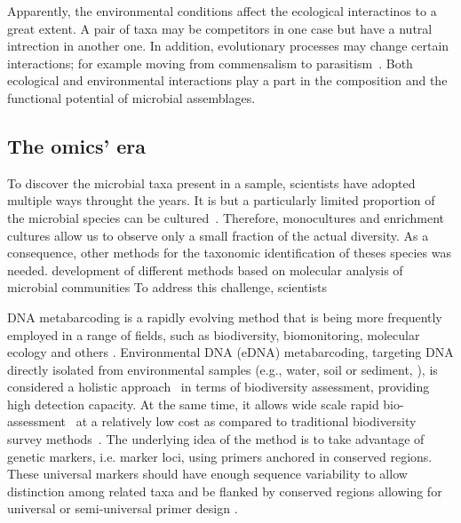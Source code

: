       Apparently, the environmental conditions affect the ecological interactinos to a
      great extent. 
      A pair of taxa may be competitors in one case but have a nutral intrection in another one. 
      In addition, evolutionary processes may change certain interactions; 
      for example moving from commensalism to parasitism~\cite{parmentier2016commensalism}.
      Both ecological and environmental interactions 
      play a part in the composition and the functional potential of 
      microbial assemblages. 



      \subsection{The omics' era}

      To discover the microbial taxa present in a sample, scientists have 
      adopted multiple ways throught the years. 
      It is but a particularly limited proportion of the microbial species 
      can be cultured~\citeyear{steen2019high}.
      Therefore, monocultures and enrichment cultures allow us to observe 
      only a small fraction of the actual diversity. 
      As a consequence, other methods for the taxonomic identification of theses
      species was needed.
      development of different methods based
      on molecular analysis of microbial communities 
      To address this challenge, scientists 
   
   
      DNA metabarcoding is a rapidly evolving method that is being more frequently employed 
      in a range of fields, such as biodiversity, biomonitoring, molecular ecology and others 
      \citep{deiner2017environmental, ruppert2019past}. 
      Environmental DNA (eDNA) metabarcoding, targeting DNA directly isolated from environmental samples 
      (e.g., water, soil or sediment, \citep{taberlet2012environmental}), is considered a holistic 
      approach~\citep{stat2017ecosystem} in terms of biodiversity assessment, providing high detection capacity. 
      At the same time, it allows wide scale rapid bio-assessment~\citep{stat2017ecosystem} 
      at a relatively low cost as compared to traditional biodiversity survey methods~\citep{ji2013reliable}. 
      The underlying idea of the method is to take advantage of genetic markers, i.e. marker loci, using primers anchored in conserved regions. 
      These universal markers should have enough sequence variability to allow distinction among related taxa and be flanked by conserved regions allowing for universal or semi-universal primer design \citep{deagle2014dna}. 
      \fi
   
